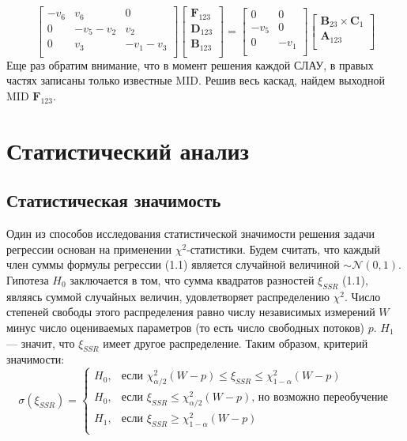 \documentclass[14pt, a4paper]{extreport}
\begin{document}
$$\begin{bmatrix}
-v_6 & v_6 & 0\\
0 & -v_5-v_2 & v_2\\
0 & v_3 & -v_1-v_3\\
\end{bmatrix}
\begin{bmatrix}
\mathbf{F}_{123}\\
\mathbf{D}_{123}\\
\mathbf{B}_{123}\\
\end{bmatrix}
=
\begin{bmatrix}
0 & 0\\
-v_5 & 0\\
0 & -v_1\\
\end{bmatrix}
\begin{bmatrix}
\mathbf{B}_{23} \times \mathbf{C}_1\\
\mathbf{A}_{123}\\
\end{bmatrix}
$$
Еще раз обратим внимание, что в момент решения каждой СЛАУ, в правых частях записаны только известные MID. Решив весь каскад, найдем выходной MID $\mathbf{F}_{123}$.
\clearpage
\section{Статистический анализ}
\subsection{Статистическая значимость}
Один из способов исследования статистической значимости решения задачи регрессии основан на применении $\chi^2$-статистики\cite{shupltesov_review_2}. Будем считать, что каждый член суммы формулы регрессии (1.1) является случайной величиной $\sim \mathcal{N}(0, 1)$. Гипотеза $H_0$ заключается в том, что сумма квадратов разностей $\xi_{SSR}$ (1.1), являясь суммой случайных величин, удовлетворяет распределению $\chi^2$. Число степеней свободы этого распределения равно числу независимых измерений $W$ минус число оцениваемых параметров (то есть число свободных потоков) $p$. $H_1$ --- значит, что $\xi_{SSR}$ имеет другое распределение. Таким образом, критерий значимости:
$$
\sigma(\xi_{SSR}) = \begin{cases}
	H_0,&\text{если $\chi^2_{\alpha / 2}(W - p) \le \xi_{SSR} \le \chi^2_{1 - \alpha}(W - p)$}\\
	H_0,&\text{если $\xi_{SSR} \leq \chi^2_{\alpha / 2}(W - p)$, но возможно переобучение}\\
	H_1,&\text{если $\xi_{SSR} \geq \chi^2_{1 - \alpha}(W - p)$}\\
\end{cases}$$
\end{document}
